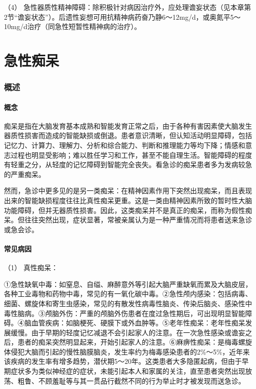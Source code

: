 （4）
急性器质性精神障碍：除积极针对病因治疗外，应处理谵妄状态（见本章第2节“谵妄状态”）。后遗性妄想可用抗精神病药奋乃静6～12mg/d，或奥氮平5～10mg/d治疗（同急性短暂性精神病的治疗）。

\protect\hypertarget{text00050.html}{}{}

\section{急性痴呆}

\subsubsection{概述}

\paragraph{概念}

痴呆是指在大脑发育基本成熟和智能发育正常之后，由于各种有害因素使大脑发生器质性损害而造成的智能缺损或倒退。患者意识清晰，但认知活动明显障碍，包括记忆力、计算力、理解力、分析和综合能力、判断和推理能力等均下降；情感和意志过程也明显受影响；难以胜任学习和工作，甚至不能自理生活。智能障碍的程度有轻重之分，从轻度的记忆障碍到智能完全丧失。看急诊的痴呆患者多为发病较急的严重痴呆。

然而，急诊中更多见的是另一类痴呆：在精神因素作用下突然出现痴呆，而且表现出来的智能缺损程度往往比真性痴呆更重。这是一类由精神因素所致的暂时性大脑功能障碍，但并无器质性损害。因此，这类痴呆并不是真正的痴呆，而称为假性痴呆。但往往突然出现，症状显著，常被亲属认为是一种严重情况而将患者送来急诊或急会诊。

\paragraph{常见病因}

\hypertarget{text00050.htmlux5cux23CHP1-18-8-1-2-1}{}
（1） 真性痴呆：

①急性缺氧中毒：如窒息、自缢、麻醉意外等引起大脑严重缺氧而累及大脑皮层，各种工业毒物和药物中毒，常见的有一氧化碳中毒。②急性颅内感染：包括病毒、细菌、螺旋体和寄生虫感染，常见的有散发性病毒性脑炎、传染后脑炎、感染性中毒性脑病。③颅脑外伤：严重的颅脑外伤患者在度过急性期后，可出现明显智能障碍。④脑血管疾病：如脑梗死、硬膜下或外血肿等。⑤老年性痴呆：老年性痴呆发展缓慢。由于早期的轻度记忆减退不会引起家人的注意。在一次急性感染或谵妄之后，患者的痴呆突然明显起来，开始引起家人的注意。⑥麻痹性痴呆：是梅毒螺旋体侵犯大脑而引起的慢性脑膜脑炎，发生率约为梅毒感染患者的2\%～5\%，近年来该疾病的发生率有增多趋势，潜伏期5～20年。这类患者大多隐匿起病，但由于早期症状多为类似神经症的症状，未能引起本人和家属的关注，直至患者突然出现放荡、粗鲁、不顾羞耻等与其一贯品行截然不同的行为举止时才被发现而送急诊。

